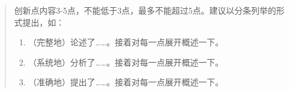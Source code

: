 

\begin{abstract}

创新点内容3-5点，不能低于3点，最多不能超过5点。建议以分条列举的形式提出，如：

\begin{enumerate}
\item{（完整地）论述了……。接着对每一点展开概述一下。}
\item{（系统地）分析了……。接着对每一点展开概述一下。}
\item{（准确地）提出了……。接着对每一点展开概述一下。}
\end{enumerate}

\end{abstract}%

